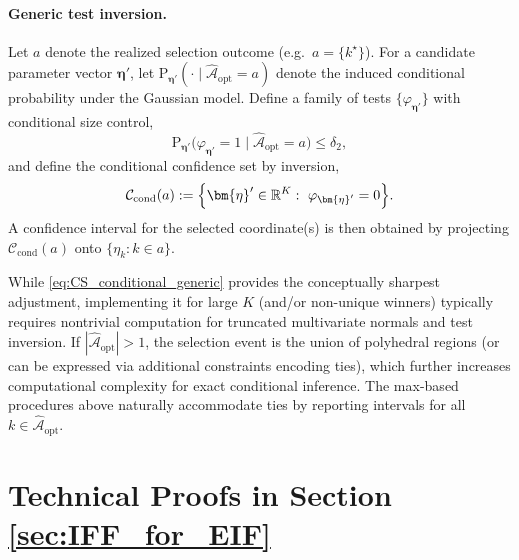 \documentclass[12pt]{article}
\theoremstyle{remark}\newtheorem{remark}[theorem]{Remark}\theoremstyle{plain}
\newcommand{\pr}{\mathrm{P}}
\begin{document}
\paragraph{Generic test inversion.}
Let $a$ denote the realized selection outcome (e.g.\ $a=\{k^\star\}$).
For a candidate parameter vector $\bm{\eta}'$, let $\pr_{\bm{\eta}'}(\cdot\mid \widehat{\mathcal{A}}_{\mathrm{opt}}=a)$
denote the induced conditional probability under the Gaussian model. Define a family of tests
$\{\varphi_{\bm{\eta}'}\}$ with conditional size control,
\[
\pr_{\bm{\eta}'}\bigl(\varphi_{\bm{\eta}'}=1\mid \widehat{\mathcal{A}}_{\mathrm{opt}}=a\bigr)\le \delta_2,
\]
and define the conditional confidence set by inversion,
\begin{equation}\label{eq:CS_conditional_generic}
\mathcal{C}_{\mathrm{cond}}(a)
:=
\Bigl\{\bm{\eta}'\in\mathbb{R}^K:\ \varphi_{\bm{\eta}'}=0\Bigr\}.
\end{equation}
A confidence interval for the selected coordinate(s) is then obtained by projecting
$\mathcal{C}_{\mathrm{cond}}(a)$ onto $\{\eta_k:k\in a\}$.

While \eqref{eq:CS_conditional_generic} provides the conceptually sharpest adjustment, implementing it for large
$K$ (and/or non-unique winners) typically requires nontrivial computation for truncated multivariate normals and
test inversion.
If $|\widehat{\mathcal{A}}_{\mathrm{opt}}|>1$, the selection event is the union of polyhedral regions (or can be
expressed via additional constraints encoding ties), which further increases computational complexity for exact
conditional inference. The max-based procedures above naturally accommodate ties by reporting intervals for all
$k\in\widehat{\mathcal{A}}_{\mathrm{opt}}$.


\section{Technical Proofs in Section \ref{sec:IFF_for_EIF}}
\end{document}
